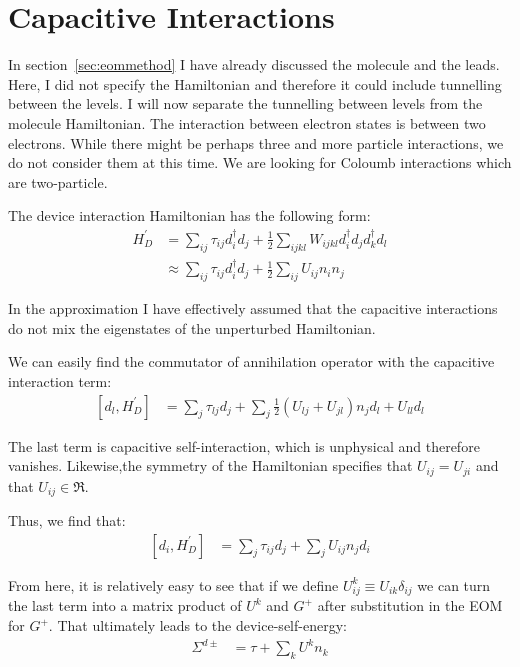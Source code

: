 \section{Capacitive Interactions} 
\label{sec:capacitive}
In section~\ref{sec:eommethod} I have already discussed the molecule and the leads. Here, I did not specify the Hamiltonian and therefore it could include tunnelling between the levels. I will now separate the tunnelling between levels from the molecule Hamiltonian. The interaction between electron states is between two electrons. While there might be perhaps three and more particle interactions, we do not consider them at this time. We are looking for Coloumb interactions which are two-particle.

The device interaction Hamiltonian has the following form:
\begin{align*}
H^\prime_D &= \sum_{ij} \tau_{ij} d^\dagger_i d_j + \frac{1}{2} \sum_{ijkl} W_{ijkl} d^\dagger_i d_j d^\dagger_k d_l \\
&\approx \sum_{ij} \tau_{ij} d^\dagger_i d_j + \frac{1}{2} \sum_{ij} U_{ij} n_i n_j
\end{align*}

In the approximation I have effectively assumed that the capacitive interactions do not mix the eigenstates of the unperturbed Hamiltonian. 

We can easily find the commutator of annihilation operator with the capacitive interaction term:
\begin{align*}
\left[ d_l, H^\prime_D\right] &= \sum_j \tau_{lj}d_j + \sum_{j} \frac{1}{2} \left( U_{lj} + U_{jl}\right) n_j d_l + U_{ll} d_l
\end{align*}

The last term is capacitive self-interaction, which is unphysical and therefore vanishes. Likewise,the symmetry of the Hamiltonian specifies that $U_{ij} = U_{ji}$ and that $U_{ij} \in \Re$. 

Thus, we find that:
\begin{align*}
\left[ d_i, H^\prime_D\right] &= \sum_j \tau_{ij}d_j + \sum_{j}U_{ij} n_j d_i
\end{align*}

From here, it is relatively easy to see that if we define $U^k_{ij} \equiv U_{ik}\delta_{ij}$ we can turn the last term into a matrix product of $U^k$ and $G^+$ after substitution in the EOM for $G^ +$. That ultimately leads to the device-self-energy:
\begin{align*}
\Sigma^{d\pm} &= \tau + \sum_k U^k n_k
\end{align*}

